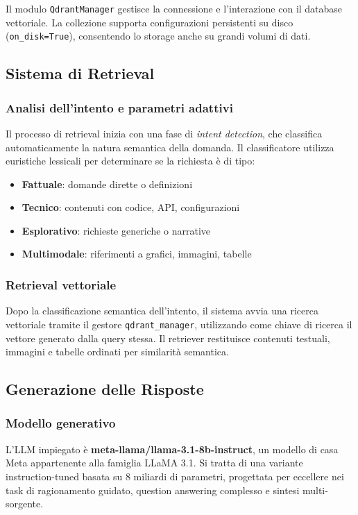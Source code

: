 \documentclass[12pt,a4paper]{article}
\begin{document}
Il modulo \verb|QdrantManager| gestisce la connessione e l'interazione con il database vettoriale. La collezione supporta configurazioni persistenti su disco (\verb|on_disk=True|), consentendo lo storage anche su grandi volumi di dati.

\subsection{Sistema di Retrieval}

\subsubsection{Analisi dell'intento e parametri adattivi}
Il processo di retrieval inizia con una fase di \textit{intent detection}, che classifica automaticamente la natura semantica della domanda. Il classificatore utilizza euristiche lessicali per determinare se la richiesta è di tipo:

\begin{itemize}
    \item \textbf{Fattuale}: domande dirette o definizioni
    \item \textbf{Tecnico}: contenuti con codice, API, configurazioni  
    \item \textbf{Esplorativo}: richieste generiche o narrative
    \item \textbf{Multimodale}: riferimenti a grafici, immagini, tabelle
\end{itemize}

\subsubsection{Retrieval vettoriale}
Dopo la classificazione semantica dell'intento, il sistema avvia una ricerca vettoriale tramite il gestore \verb|qdrant_manager|, utilizzando come chiave di ricerca il vettore generato dalla query stessa. Il retriever restituisce contenuti testuali, immagini e tabelle ordinati per similarità semantica.

\subsection{Generazione delle Risposte}

\subsubsection{Modello generativo}
L'LLM impiegato è \textbf{meta-llama/llama-3.1-8b-instruct}, un modello di casa Meta appartenente alla famiglia LLaMA 3.1. Si tratta di una variante instruction-tuned basata su 8 miliardi di parametri, progettata per eccellere nei task di ragionamento guidato, question answering complesso e sintesi multi-sorgente.
\end{document}
